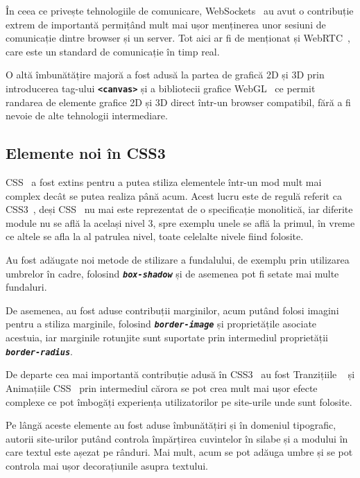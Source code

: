 \documentclass[12pt]{article} %
\begin{document}
În ceea ce privește tehnologiile de comunicare, WebSockets~\cite{website:websockets} au avut o contribuție
extrem de importantă permițând mult mai ușor menținerea unor sesiuni de comunicație dintre browser și un
server. Tot aici ar fi de menționat și WebRTC~\cite{website:webrtc}, care este un standard de comunicație în
timp real.

O altă îmbunătățire majoră a fost adusă la partea de grafică 2D și 3D prin introducerea tag-ului
\textbf{\lstinline{<canvas>}} și a bibliotecii grafice WebGL~\cite{website:webgl} ce permit randarea de
elemente grafice 2D și 3D direct într-un browser compatibil, fără a fi nevoie de alte tehnologii intermediare.


\subsection{Elemente noi în CSS3} %

CSS~\cite{website:css} a fost extins pentru a putea stiliza elementele într-un mod mult mai complex decât se
putea realiza până acum. Acest lucru este de regulă referit ca CSS3~\cite{website:css3}, deși
CSS~\cite{website:css} nu mai este reprezentat de o specificație monolitică, iar diferite module nu se află
la același nivel 3, spre exemplu unele se află la primul, în vreme ce altele se afla la al patrulea nivel,
toate celelalte nivele fiind folosite.

Au fost adăugate noi metode de stilizare a fundalului, de exemplu prin utilizarea umbrelor în cadre, folosind
\textbf{\textit{\lstinline{box-shadow}}} și de asemenea pot fi setate mai multe fundaluri.

De asemenea, au fost aduse contribuții marginilor, acum putând folosi imagini pentru a stiliza marginile,
folosind \textbf{\textit{\lstinline{border-image}}} și proprietățile asociate acestuia, iar marginile
rotunjite sunt suportate prin intermediul proprietății \textbf{\textit{\lstinline{border-radius}}}.

De departe cea mai importantă contribuție adusă în CSS3~\cite{website:css3} au fost Tranzițiile
~\cite{website:transitions} și Animațiile CSS~\cite{website:animations} prin intermediul cărora se pot crea
mult mai ușor efecte complexe ce pot îmbogăți experiența utilizatorilor pe site-urile unde sunt folosite.

Pe lângă aceste elemente au fost aduse îmbunătățiri și în domeniul tipografic, autorii site-urilor putând
controla împărțirea cuvintelor în silabe și a modului în care textul este așezat pe rânduri. Mai mult,
acum se pot adăuga umbre și se pot controla mai ușor decorațiunile asupra textului.
\end{document}
